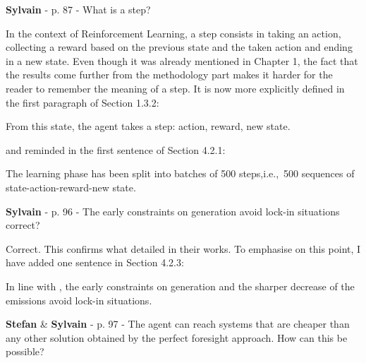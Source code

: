 \documentclass[12pt,a4paper]{article}
\def\ie{i.e.,\ }
\begin{document}
\begin{mdframed}[style=comment] %
{\color{purple} \textbf{Sylvain}} - p. 87 - What is a step?
\end{mdframed}

\noindent In the context of Reinforcement Learning, a step consists in taking an action, collecting a reward based on the previous state and the taken action and ending in a new state. Even though it was already mentioned in Chapter 1, the fact that the results come further from the methodology part makes it harder for the reader to remember the meaning of a step. It is now more explicitly defined {\color{blue}in the first paragraph of Section 1.3.2}:

\begin{mdframed}[style=manuscript] %
From this state, the agent takes a step: action, reward, new state.
\end{mdframed}

\noindent and reminded {\color{blue}in the first sentence of Section 4.2.1}:

\begin{mdframed}[style=manuscript] %
The learning phase has been split into batches of 500 steps,\ie 500 sequences of state-action-reward-new state. 
\end{mdframed}

\begin{mdframed}[style=comment] %
{\color{purple} \textbf{Sylvain}} - p. 96 - The early constraints on generation avoid lock-in situations correct?
\end{mdframed}

\noindent Correct. This confirms what \citet{vogt2018starting} detailed in their works. To emphasise on this point, I have added one sentence {\color{blue}in Section 4.2.3}:

\begin{mdframed}[style=manuscript] %
In line with \citet{vogt2018starting}, the early constraints on generation and the sharper decrease of the emissions avoid lock-in situations.
\end{mdframed}

\begin{mdframed}[style=comment] %
{\color{teal} \textbf{Stefan}} \& {\color{purple} \textbf{Sylvain}} - p. 97 - The agent can reach systems that are cheaper than any other solution obtained by the perfect foresight approach. How can this be possible?
\end{mdframed}
\end{document}
